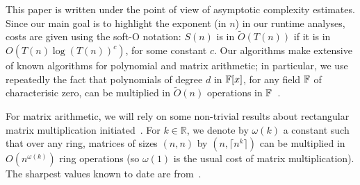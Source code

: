 This paper is written under the point of view of asymptotic complexity
estimates. Since our main goal is to highlight the exponent (in $n$)
in our runtime analyses, costs are given using the soft-O notation:
$S(n)$ is in $\tilde{O}(T(n))$ if it is in $O(T(n) \log(T(n))^c)$, for
some constant $c$. Our algorithms make extensive of known algorithms
for polynomial and matrix arithmetic; in particular, we use repeatedly
the fact that polynomials of degree $d$ in $\mathbb{F}[x]$, for any field $\mathbb{F}$
of characterisic zero, can be multiplied in $\tilde{O}(n)$ operations
in $\mathbb{F}$~\cite{ScSt71}. 

For matrix arithmetic, we will rely on some non-trivial results about
rectangular matrix multiplication initiated~\cite{LoRo83}. For $k \in
\mathbb{R}$, we denote by $\omega(k)$ a constant such that over any
ring, matrices of sizes $(n,n)$ by $(n,\lceil n^k \rceil)$ can be
multiplied in $O(n^{\omega(k)})$ ring operations (so $\omega(1)$ is
the usual cost of matrix multiplication).  The sharpest values known
to date are from~\cite{LeGall}.



